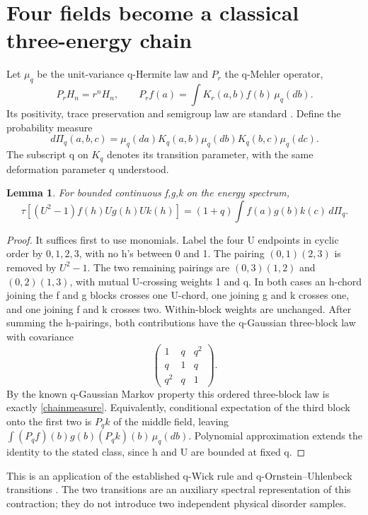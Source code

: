 \documentclass[11pt]{article}
\newcommand{\tr}{\tau}
\newtheorem{lemma}{Lemma}
\begin{document}
\newpage
\section{Four fields become a classical three-energy chain}
Let $\mu_q$ be the unit-variance q-Hermite law and $P_r$ the
q-Mehler operator,
\[
 P_rH_n=r^nH_n,\qquad
 P_rf(a)=\int K_r(a,b)f(b)\,\mu_q(db).
\]
Its positivity, trace preservation and semigroup law are standard
\cite{bks}. Define the probability measure
\begin{equation}\label{chainmeasure}
 d\Pi_q(a,b,c)=
 \mu_q(da)K_q(a,b)\mu_q(db)K_q(b,c)\mu_q(dc).
\end{equation}
The subscript q on $K_q$ denotes its transition parameter, with
the same deformation parameter q understood.

\begin{lemma}\label{four}
For bounded continuous f,g,k on the energy spectrum,
\begin{equation}\label{fouridentity}
 \tr[(U^2-1)f(h)U g(h)U k(h)]
   =(1+q)\int f(a)g(b)k(c)\,d\Pi_q.
\end{equation}
\end{lemma}
\begin{proof}
It suffices first to use monomials. Label the four U endpoints
in cyclic order by $0,1,2,3$, with no h's between 0 and 1.
The pairing $(0,1)(2,3)$ is removed by $U^2-1$.
The two remaining pairings are $(0,3)(1,2)$ and
$(0,2)(1,3)$, with mutual U-crossing weights 1 and q.
In both cases an h-chord joining the f and g blocks crosses one
U-chord, one joining g and k crosses one, and one joining f and k
crosses two. Within-block weights are unchanged. After summing
the h-pairings, both contributions have the q-Gaussian three-block
law with covariance
\[
 \begin{pmatrix}1&q&q^2\\q&1&q\\q^2&q&1\end{pmatrix}.
\]
By the known q-Gaussian Markov property this ordered three-block
law is exactly \eqref{chainmeasure}. Equivalently, conditional
expectation of the third block onto the first two is $P_qk$ of
the middle field, leaving
$\int(P_qf)(b)g(b)(P_qk)(b)\,\mu_q(db)$.
Polynomial approximation extends the identity to the stated class,
since h and U are bounded at fixed q.
\end{proof}

This is an application of the established q-Wick rule and
q-Ornstein--Uhlenbeck transitions \cite{bks,eff}. The two transitions
are an auxiliary spectral representation of this contraction;
they do not introduce two independent physical disorder samples.
\end{document}

